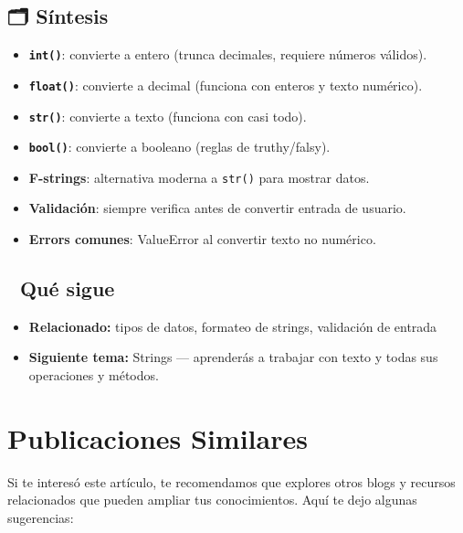 \documentclass[
  doc,
  floatsintext,
  longtable,
  a4paper,
  nolmodern,
  notxfonts,
  notimes,
  12pt,
  colorlinks=true,linkcolor=blue,citecolor=blue,urlcolor=blue]{apa7}
\providecommand{\tightlist}{%
  \setlength{\itemsep}{0pt}\setlength{\parskip}{0pt}}
\begin{document}
\subsection{🗂️ Síntesis}\label{suxedntesis}

\begin{itemize}
\tightlist
\item
  \textbf{\texttt{int()}}: convierte a entero (trunca decimales,
  requiere números válidos).
\item
  \textbf{\texttt{float()}}: convierte a decimal (funciona con enteros y
  texto numérico).
\item
  \textbf{\texttt{str()}}: convierte a texto (funciona con casi todo).
\item
  \textbf{\texttt{bool()}}: convierte a booleano (reglas de
  truthy/falsy).
\item
  \textbf{F-strings}: alternativa moderna a \texttt{str()} para mostrar
  datos.
\item
  \textbf{Validación}: siempre verifica antes de convertir entrada de
  usuario.
\item
  \textbf{Errors comunes}: ValueError al convertir texto no numérico.
\end{itemize}

\subsection{🔗 Qué sigue}\label{quuxe9-sigue}

\begin{itemize}
\tightlist
\item
  \textbf{Relacionado:} tipos de datos, formateo de strings, validación
  de entrada
\item
  \textbf{Siguiente tema:} Strings --- aprenderás a trabajar con texto y
  todas sus operaciones y métodos.
\end{itemize}

\section{Publicaciones Similares}\label{publicaciones-similares}

Si te interesó este artículo, te recomendamos que explores otros blogs y
recursos relacionados que pueden ampliar tus conocimientos. Aquí te dejo
algunas sugerencias:
\end{document}
